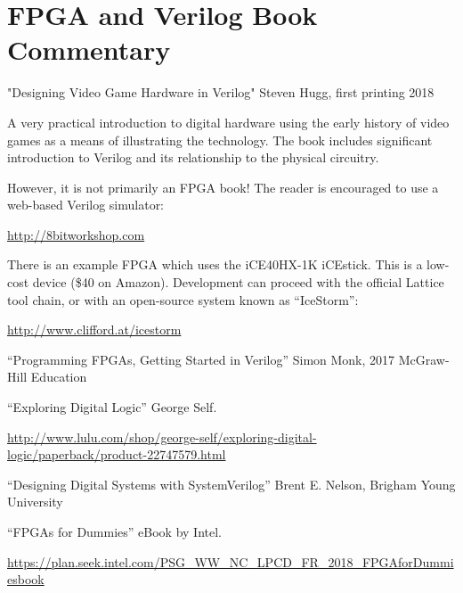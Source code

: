 \section{FPGA and Verilog Book Commentary}

"Designing Video Game Hardware in Verilog"
Steven Hugg, first printing 2018

A very practical introduction to digital hardware using the early history of video games as a means of illustrating the technology.
The book includes significant introduction to Verilog and its relationship to the physical circuitry.

However, it is not primarily an FPGA book!  The reader is encouraged to use a web-based Verilog simulator:

\url{http://8bitworkshop.com}

There is an example FPGA which uses the iCE40HX-1K iCEstick.
This is a low-cost device (\$40 on Amazon).  Development can proceed
with the official Lattice tool chain, or with an open-source system
known as ``IceStorm'':

\url{http://www.clifford.at/icestorm}

``Programming FPGAs, Getting Started in Verilog''
Simon Monk, 2017 McGraw-Hill Education

``Exploring Digital Logic''
George Self.

\url{http://www.lulu.com/shop/george-self/exploring-digital-logic/paperback/product-22747579.html}

``Designing Digital Systems with SystemVerilog''
Brent E. Nelson, Brigham Young University

``FPGAs for Dummies''
eBook by Intel.

\url{https://plan.seek.intel.com/PSG_WW_NC_LPCD_FR_2018_FPGAforDummiesbook}

